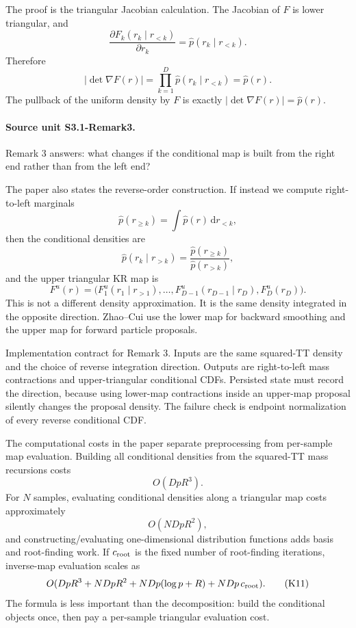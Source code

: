 \documentclass[11pt]{article}
\newcommand{\dd}{\,\mathrm d}
\begin{document}
The proof is the triangular Jacobian calculation.  The Jacobian of \(F\) is
lower triangular, and
\[
    \frac{\partial F_k(r_k\mid r_{<k})}{\partial r_k}
    =
    \widehat p(r_k\mid r_{<k}).
\]
Therefore
\[
    |\det\nabla F(r)|
    =
    \prod_{k=1}^D \widehat p(r_k\mid r_{<k})
    =
    \widehat p(r).
    \tag{K5}
\]
The pullback of the uniform density by \(F\) is exactly
\(|\det\nabla F(r)|=\widehat p(r)\).

\paragraph{Source unit S3.1-Remark3.}
Remark 3 answers: what changes if the conditional map is built from the right
end rather than from the left end?

The paper also states the reverse-order construction.  If instead we compute
right-to-left marginals
\[
    \widehat p(r_{\ge k})
    =
    \int \widehat p(r)\dd r_{<k},
    \tag{K6}
\]
then the conditional densities are
\[
    \widehat p(r_k\mid r_{>k})
    =
    \frac{\widehat p(r_{\ge k})}{\widehat p(r_{>k})},
    \tag{K7}
\]
and the upper triangular KR map is
\[
    F^u(r)
    =
    \bigl(
    F^u_1(r_1\mid r_{>1}),\ldots,
    F^u_{D-1}(r_{D-1}\mid r_D),F^u_D(r_D)
    \bigr).
    \tag{K8}
\]
This is not a different density approximation.  It is the same density
integrated in the opposite direction.  Zhao--Cui use the lower map for
backward smoothing and the upper map for forward particle proposals.

Implementation contract for Remark 3.  Inputs are the same squared-TT density
and the choice of reverse integration direction.  Outputs are right-to-left
mass contractions and upper-triangular conditional CDFs.  Persisted state must
record the direction, because using lower-map contractions inside an upper-map
proposal silently changes the proposal density.  The failure check is endpoint
normalization of every reverse conditional CDF.

The computational costs in the paper separate preprocessing from per-sample
map evaluation.  Building all conditional densities from the squared-TT mass
recursions costs
\[
    O(DpR^3).
    \tag{K9}
\]
For \(N\) samples, evaluating conditional densities along a triangular map
costs approximately
\[
    O(NDpR^2),
    \tag{K10}
\]
and constructing/evaluating one-dimensional distribution functions adds basis
and root-finding work.  If \(c_{\rm root}\) is the fixed number of root-finding
iterations, inverse-map evaluation scales as
\[
    O(DpR^3+NDpR^2+NDp(\log p+R)+NDp\,c_{\rm root}).
    \tag{K11}
\]
The formula is less important than the decomposition: build the conditional
objects once, then pay a per-sample triangular evaluation cost.
\end{document}
